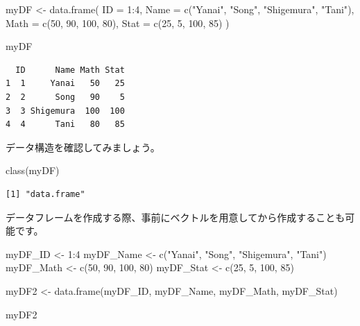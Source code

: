 \documentclass[
  a4paper,
  pandoc,
  ja=standard,
  jafont=haranoaji]{bxjsbook}
\newenvironment{Shaded}{\begin{snugshade}}{\end{snugshade}}
\newcommand{\AttributeTok}[1]{\textcolor[rgb]{0.00,0.48,0.65}{#1}}
\newcommand{\DecValTok}[1]{\textcolor[rgb]{0.68,0.00,0.00}{#1}}
\newcommand{\FunctionTok}[1]{\textcolor[rgb]{0.28,0.35,0.67}{#1}}
\newcommand{\NormalTok}[1]{\textcolor[rgb]{0.00,0.48,0.65}{#1}}
\newcommand{\OtherTok}[1]{\textcolor[rgb]{0.00,0.48,0.65}{#1}}
\newcommand{\SpecialCharTok}[1]{\textcolor[rgb]{0.37,0.37,0.37}{#1}}
\newcommand{\StringTok}[1]{\textcolor[rgb]{0.13,0.47,0.30}{#1}}
\begin{document}
\begin{Shaded}
\begin{Highlighting}[numbers=left,,]
\NormalTok{myDF }\OtherTok{\textless{}{-}} \FunctionTok{data.frame}\NormalTok{(}
    \AttributeTok{ID   =} \DecValTok{1}\SpecialCharTok{:}\DecValTok{4}\NormalTok{,}
    \AttributeTok{Name =} \FunctionTok{c}\NormalTok{(}\StringTok{"Yanai"}\NormalTok{, }\StringTok{"Song"}\NormalTok{, }\StringTok{"Shigemura"}\NormalTok{, }\StringTok{"Tani"}\NormalTok{),}
    \AttributeTok{Math =} \FunctionTok{c}\NormalTok{(}\DecValTok{50}\NormalTok{, }\DecValTok{90}\NormalTok{, }\DecValTok{100}\NormalTok{, }\DecValTok{80}\NormalTok{),}
    \AttributeTok{Stat =} \FunctionTok{c}\NormalTok{(}\DecValTok{25}\NormalTok{, }\DecValTok{5}\NormalTok{, }\DecValTok{100}\NormalTok{, }\DecValTok{85}\NormalTok{)}
\NormalTok{    )}

\NormalTok{myDF}
\end{Highlighting}
\end{Shaded}

\begin{verbatim}
  ID      Name Math Stat
1  1     Yanai   50   25
2  2      Song   90    5
3  3 Shigemura  100  100
4  4      Tani   80   85
\end{verbatim}

データ構造を確認してみましょう。

\begin{Shaded}
\begin{Highlighting}[numbers=left,,]
\FunctionTok{class}\NormalTok{(myDF)}
\end{Highlighting}
\end{Shaded}

\begin{verbatim}
[1] "data.frame"
\end{verbatim}

データフレームを作成する際、事前にベクトルを用意してから作成することも可能です。

\begin{Shaded}
\begin{Highlighting}[numbers=left,,]
\NormalTok{myDF\_ID   }\OtherTok{\textless{}{-}} \DecValTok{1}\SpecialCharTok{:}\DecValTok{4}
\NormalTok{myDF\_Name }\OtherTok{\textless{}{-}} \FunctionTok{c}\NormalTok{(}\StringTok{"Yanai"}\NormalTok{, }\StringTok{"Song"}\NormalTok{, }\StringTok{"Shigemura"}\NormalTok{, }\StringTok{"Tani"}\NormalTok{)}
\NormalTok{myDF\_Math }\OtherTok{\textless{}{-}} \FunctionTok{c}\NormalTok{(}\DecValTok{50}\NormalTok{, }\DecValTok{90}\NormalTok{, }\DecValTok{100}\NormalTok{, }\DecValTok{80}\NormalTok{)}
\NormalTok{myDF\_Stat }\OtherTok{\textless{}{-}} \FunctionTok{c}\NormalTok{(}\DecValTok{25}\NormalTok{, }\DecValTok{5}\NormalTok{, }\DecValTok{100}\NormalTok{, }\DecValTok{85}\NormalTok{)}

\NormalTok{myDF2 }\OtherTok{\textless{}{-}} \FunctionTok{data.frame}\NormalTok{(myDF\_ID, myDF\_Name, myDF\_Math, myDF\_Stat)}

\NormalTok{myDF2}
\end{Highlighting}
\end{Shaded}
\end{document}
